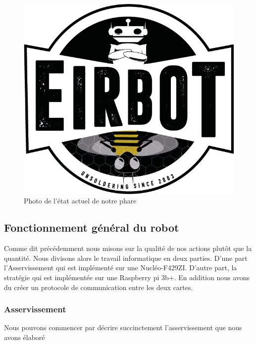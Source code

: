 \documentclass[a4paper,10pt]{article}
\begin{document}
\begin{spacing}{1.5}
\begin{figure}[H]
  \includegraphics[scale=0.3]{LogoEirbot.png}
  \caption{Photo de l'état actuel de notre phare}
\end{figure}
\subsection{Fonctionnement général du robot}
Comme dit précédemment nous misons sur la qualité de nos actions plutôt que la
quantité. Nous divisons alors le travail informatique en deux parties. D'une
part l'Asservissement qui est implémenté sur une Nucléo-F429ZI. D'autre part, la
stratégie qui est implémentée sur une Raspberry pi 3b+. En addition nous avons du
créer un protocole de communication entre les deux cartes.\\

\subsubsection{Asservissement}
Nous pouvons commencer par décrire succinctement l'asservissement que nous avons
élaboré \\ %


\end{spacing}
\end{document}
